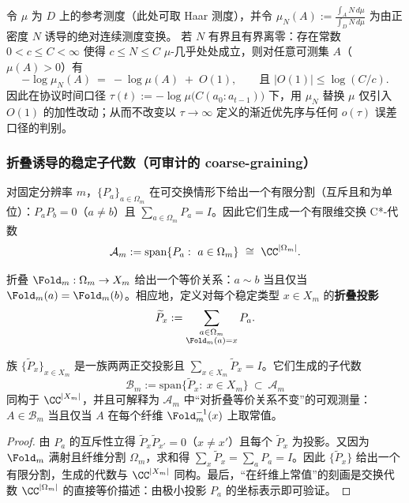 \begin{corollary}\label{cor:op-algebra-lapse-time-gauge-invariance}
令 \(\mu\) 为 \(D\) 上的参考测度（此处可取 Haar 测度），并令
\(
\mu_N(A):=\frac{\int_A N\,d\mu}{\int_D N\,d\mu}
\)
为由正密度 \(N\) 诱导的绝对连续测度变换。
若 \(N\) 有界且有界离零：存在常数 \(0<c\le C<\infty\) 使得 \(c\le N\le C\) \(\mu\)-几乎处处成立，则对任意可测集 \(A\)（\(\mu(A)>0\)）有
\[
-\log\mu_N(A)
~=~
-\log\mu(A)\;+\;O(1),
\qquad
\text{且 }|O(1)|\le \log(C/c).
\]
因此在协议时间口径
\(
\tau(t):=-\log\mu\bigl(C(a_0{:}a_{t-1})\bigr)
\)
下，用 \(\mu_N\) 替换 \(\mu\) 仅引入 \(O(1)\) 的加性改动；从而不改变以 \(\tau\to\infty\) 定义的渐近优先序与任何 \(o(\tau)\) 误差口径的判别。
\end{corollary}

\subsubsection{折叠诱导的稳定子代数（可审计的 coarse-graining）}\label{app:op-algebra-fold-subalgebra}

对固定分辨率 $m$，$\{P_a\}_{a\in\Omega_m}$ 在可交换情形下给出一个有限分割（互斥且和为单位）：$P_aP_b=0$（$a\neq b$）且 $\sum_{a\in\Omega_m}P_a=I$。因此它们生成一个有限维交换 C*-代数
\[
\mathcal{A}_m:=\mathrm{span}\{P_a:\ a\in\Omega_m\}\ \cong\ \CC^{|\Omega_m|}.
\]

折叠 $\Fold_m:\Omega_m\to X_m$ 给出一个等价关系：$a\sim b$ 当且仅当 $\Fold_m(a)=\Fold_m(b)$。相应地，定义对每个稳定类型 $x\in X_m$ 的\textbf{折叠投影}
\[
\widetilde P_x:=\sum_{\substack{a\in\Omega_m\\ \Fold_m(a)=x}} P_a.
\]

\begin{proposition}[折叠不变量子代数]\label{prop:fold-invariant-subalgebra}
族 $\{\widetilde P_x\}_{x\in X_m}$ 是一族两两正交投影且 $\sum_{x\in X_m}\widetilde P_x=I$。它们生成的子代数
\[
\mathcal{B}_m:=\mathrm{span}\{\widetilde P_x:\ x\in X_m\}\ \subset\ \mathcal{A}_m
\]
同构于 $\CC^{|X_m|}$，并且可解释为 $\mathcal{A}_m$ 中“对折叠等价关系不变”的可观测量：$A\in\mathcal{B}_m$ 当且仅当 $A$ 在每个纤维 $\Fold_m^{-1}(x)$ 上取常值。
\end{proposition}

\begin{proof}
由 $P_a$ 的互斥性立得 $\widetilde P_x\widetilde P_{x'}=0$（$x\neq x'$）且每个 $\widetilde P_x$ 为投影。又因为 $\Fold_m$ 满射且纤维分割 $\Omega_m$，求和得 $\sum_{x}\widetilde P_x=\sum_{a}P_a=I$。因此 $\{\widetilde P_x\}$ 给出一个有限分割，生成的代数与 $\CC^{|X_m|}$ 同构。最后，“在纤维上常值”的刻画是交换代数 $\CC^{|\Omega_m|}$ 的直接等价描述：由极小投影 $P_a$ 的坐标表示即可验证。
\end{proof}

